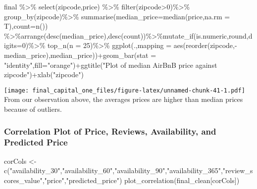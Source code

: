 \documentclass[
]{article}
\newenvironment{Shaded}{\begin{snugshade}}{\end{snugshade}}
\newcommand{\AttributeTok}[1]{\textcolor[rgb]{0.77,0.63,0.00}{#1}}
\newcommand{\DecValTok}[1]{\textcolor[rgb]{0.00,0.00,0.81}{#1}}
\newcommand{\FunctionTok}[1]{\textcolor[rgb]{0.00,0.00,0.00}{#1}}
\newcommand{\NormalTok}[1]{#1}
\newcommand{\OtherTok}[1]{\textcolor[rgb]{0.56,0.35,0.01}{#1}}
\newcommand{\SpecialCharTok}[1]{\textcolor[rgb]{0.00,0.00,0.00}{#1}}
\newcommand{\StringTok}[1]{\textcolor[rgb]{0.31,0.60,0.02}{#1}}
\begin{document}
\begin{Shaded}
\begin{Highlighting}[]
\NormalTok{final }\SpecialCharTok{\%\textgreater{}\%} \FunctionTok{select}\NormalTok{(zipcode,price) }\SpecialCharTok{\%\textgreater{}\%} \FunctionTok{filter}\NormalTok{(zipcode}\SpecialCharTok{\textgreater{}}\DecValTok{0}\NormalTok{)}\SpecialCharTok{\%\textgreater{}\%} \FunctionTok{group\_by}\NormalTok{(zipcode)}\SpecialCharTok{\%\textgreater{}\%} \FunctionTok{summarise}\NormalTok{(}\AttributeTok{median\_price=}\FunctionTok{median}\NormalTok{(price,}\AttributeTok{na.rm =}\NormalTok{ T),}\AttributeTok{count=}\FunctionTok{n}\NormalTok{()) }\SpecialCharTok{\%\textgreater{}\%}\FunctionTok{arrange}\NormalTok{(}\FunctionTok{desc}\NormalTok{(median\_price),}\FunctionTok{desc}\NormalTok{(count))}\SpecialCharTok{\%\textgreater{}\%}\FunctionTok{mutate\_if}\NormalTok{(is.numeric,round,}\AttributeTok{digits=}\DecValTok{0}\NormalTok{)}\SpecialCharTok{\%\textgreater{}\%} \FunctionTok{top\_n}\NormalTok{(}\AttributeTok{n =} \DecValTok{25}\NormalTok{)}\SpecialCharTok{\%\textgreater{}\%} \FunctionTok{ggplot}\NormalTok{(.,}\AttributeTok{mapping =} \FunctionTok{aes}\NormalTok{(}\FunctionTok{reorder}\NormalTok{(zipcode,}\SpecialCharTok{{-}}\NormalTok{median\_price),median\_price))}\SpecialCharTok{+}\FunctionTok{geom\_bar}\NormalTok{(}\AttributeTok{stat =} \StringTok{"identity"}\NormalTok{,}\AttributeTok{fill=}\StringTok{"orange"}\NormalTok{)}\SpecialCharTok{+}\FunctionTok{ggtitle}\NormalTok{(}\StringTok{"Plot of median AirBnB price against zipcode"}\NormalTok{)}\SpecialCharTok{+}\FunctionTok{xlab}\NormalTok{(}\StringTok{"zipcode"}\NormalTok{)}
\end{Highlighting}
\end{Shaded}

\texttt{[image: final\_capital\_one\_files/figure-latex/unnamed-chunk-41-1.pdf]}
From our observation above, the averages prices are higher than median
prices because of outliers.

\hypertarget{correlation-plot-of-price-reviews-availability-and-predicted-price}{%
\subsubsection{Correlation Plot of Price, Reviews, Availability, and
Predicted
Price}\label{correlation-plot-of-price-reviews-availability-and-predicted-price}}

\begin{Shaded}
\begin{Highlighting}[]
\NormalTok{corCols }\OtherTok{\textless{}{-}} \FunctionTok{c}\NormalTok{(}\StringTok{"availability\_30"}\NormalTok{,}\StringTok{"availability\_60"}\NormalTok{,}\StringTok{"availability\_90"}\NormalTok{,}\StringTok{"availability\_365"}\NormalTok{,}\StringTok{"review\_scores\_value"}\NormalTok{,}\StringTok{"price"}\NormalTok{,}\StringTok{"predicted\_price"}\NormalTok{)}
\FunctionTok{plot\_correlation}\NormalTok{(final\_clean[corCols])}
\end{Highlighting}
\end{Shaded}
\end{document}
